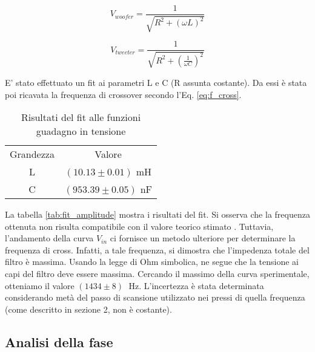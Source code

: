 \documentclass[../Relazione_circuiti]{subfiles}
\begin{document}
\begin{equation}
V_{woofer} = \frac{1}{\sqrt{R^2+(\omega L)^2}}
\end{equation}

\begin{equation}
V_{tweeter} = \frac{1}{\sqrt{R^2+(\frac{1}{\omega C})^2}}
\end{equation}



E' stato effettuato un fit ai parametri L e C (R assunta costante). Da essi è stata poi ricavata la frequenza di crossover secondo l'Eq. \ref{eq:f_cross}. 

\begin{table}
    \centering

\begin{tabular}{c | c }

Grandezza & Valore \\

L & $(10.13 \pm 0.01)$ mH \\
C & $(953.39 \pm 0.05)$ nF

\end{tabular}

\caption{Risultati del fit alle funzioni guadagno in tensione}
\label{tab: fit_amplitude}

\end{table}

La tabella \ref{tab:fit_amplitude} mostra i risultati del fit. Si osserva che la frequenza ottenuta non risulta compatibile con il valore teorico stimato \theoryF.
Tuttavia, l'andamento della curva $V_{in}$ ci fornisce un metodo ulteriore per determinare la frequenza di cross. Infatti, a tale frequenza, si dimostra che l'impedenza totale del filtro è massima.
Usando la legge di Ohm simbolica, ne segue che la tensione ai capi del filtro deve essere massima. Cercando il massimo della curva sperimentale, otteniamo il valore $(1434 \pm 8) \;$ Hz. 
L'incertezza è stata determinata considerando metà del passo di scansione utilizzato nei pressi di quella frequenza (come descritto in sezione 2, non è costante).


\subsection{Analisi della fase}
\end{document}
